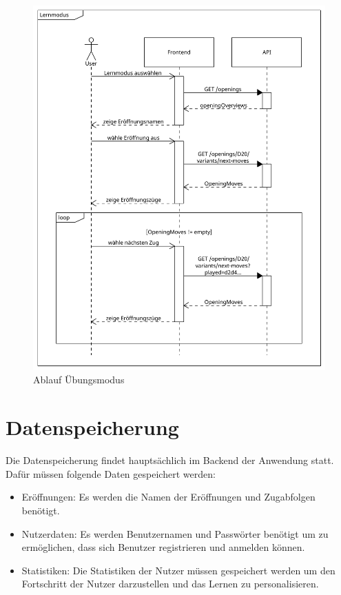 \begin{figure}
    \includegraphics[width=\linewidth]{images/diagrams/sd_opening_training}
    \caption{Ablauf Übungsmodus}
    \label{fig:sd_opening_training}
\end{figure}

\section{Datenspeicherung}
Die Datenspeicherung findet hauptsächlich im Backend der Anwendung statt. Dafür müssen folgende Daten gespeichert werden:
\begin{itemize}
    \item Eröffnungen: Es werden die Namen der Eröffnungen und Zugabfolgen benötigt.
    \item Nutzerdaten: Es werden Benutzernamen und Passwörter benötigt um zu ermöglichen, dass sich Benutzer registrieren und anmelden können.
    \item Statistiken: Die Statistiken der Nutzer müssen gespeichert werden um den Fortschritt der Nutzer darzustellen und das Lernen zu personalisieren.
\end{itemize}

